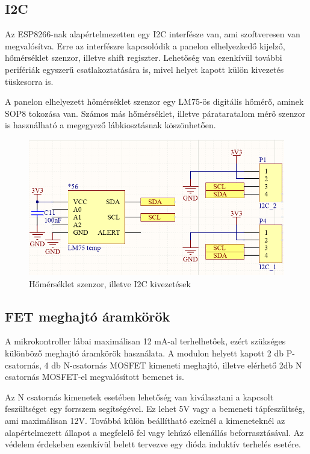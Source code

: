\subsection{I2C}
Az ESP8266-nak alapértelmezetten egy I2C interfésze van, ami szoftveresen van megvalósítva. Erre az interfészre kapcsolódik a panelon elhelyezkedő kijelző, hőmérséklet szenzor, illetve shift regiszter. Lehetőség van ezenkívül további perifériák egyszerű csatlakoztatására is, mivel helyet kapott külön kivezetés tüskesorra is.

A panelon elhelyezett hőmérséklet szenzor egy LM75-ös digitális hőmérő, aminek SOP8 tokozása van. Számos más hőmérséklet, illetve párataratalom mérő szenzor is használható a megegyező lábkiosztásnak köszönhetően.
\begin{figure}[!ht]
    \centering
    \includegraphics[width=130mm, keepaspectratio]{figures/i2c_devices.png}
    \caption{Hőmérséklet szenzor, illetve I2C kivezetések}
    \label{fig:i2c}
\end{figure}
\clearpage
\subsection{FET meghajtó áramkörök}
A mikrokontroller lábai maximálisan 12 mA-al terhelhetőek, ezért szükséges különböző meghajtó áramkörök használata. A modulon helyett kapott 2 db P-csatornás, 4 db N-csatornás MOSFET kimeneti meghajtó, illetve elérhető 2db N csatornás MOSFET-el megvalósított bemenet is.

Az N csatornás kimenetek esetében lehetőség van kiválasztani a kapcsolt feszültséget egy forrszem segítségével. Ez lehet 5V vagy a bemeneti tápfeszültség, ami maximálisan 12V. Továbbá külön beállítható ezeknél a kimeneteknél az alapértelmezett állapot a megfelelő fel vagy lehúzó ellenállás beforrasztásával. Az védelem érdekeben ezenkívül belett tervezve egy dióda induktív terhelés esetére.

